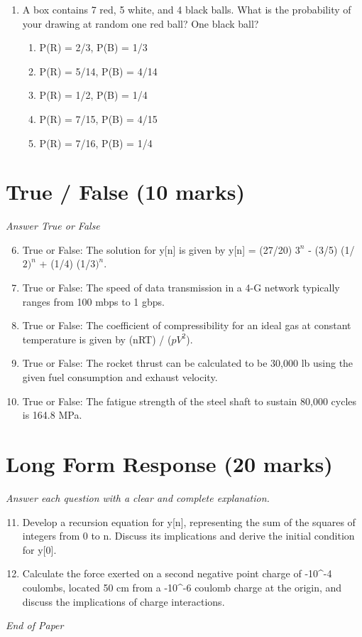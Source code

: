 \documentclass[12pt]{article}
\begin{document}
\begin{enumerate}[label=\arabic*.]
\begin{enumerate}[label=(\alph*)]
    \item FIFO memory
    \item Flash memory
    \item LIFO memory
    \item LILO memory
\end{enumerate}
\item A box contains 7 red, 5 white, and 4 black balls. What is the probability of your drawing at random one red ball? One black ball?
\begin{enumerate}[label=(\alph*)]
    \item P(R) = 2/3, P(B) = 1/3
    \item P(R) = 5/14, P(B) = 4/14
    \item P(R) = 1/2, P(B) = 1/4
    \item P(R) = 7/15, P(B) = 4/15
    \item P(R) = 7/16, P(B) = 1/4
\end{enumerate}
\end{enumerate}

\section*{True / False (10 marks)}
\textit{Answer True or False}
\begin{enumerate}[label=\arabic*.]
\setcounter{enumi}{5}
\item True or False: The solution for y[n] is given by y[n] = (27/20) $3^n$ - (3/5) (1/$2)^n$ + (1/4) (1/$3)^n$.
\item True or False: The speed of data transmission in a 4-G network typically ranges from 100 mbps to 1 gbps.
\item True or False: The coefficient of compressibility for an ideal gas at constant temperature is given by (nRT) / ($pV^2$).
\item True or False: The rocket thrust can be calculated to be 30,000 lb using the given fuel consumption and exhaust velocity.
\item True or False: The fatigue strength of the steel shaft to sustain 80,000 cycles is 164.8 MPa.
\end{enumerate}

\section*{Long Form Response (20 marks)}
\textit{Answer each question with a clear and complete explanation.}
\begin{enumerate}[label=\arabic*.]
\setcounter{enumi}{10}
\item Develop a recursion equation for y[n], representing the sum of the squares of integers from 0 to n. Discuss its implications and derive the initial condition for y[0].
\item Calculate the force exerted on a second negative point charge of -10^-4 coulombs, located 50 cm from a -10^-6 coulomb charge at the origin, and discuss the implications of charge interactions.
\end{enumerate}

\vfill
\noindent\textit{End of Paper}
\end{document}
